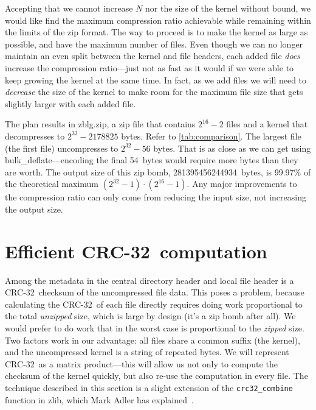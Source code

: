 \documentclass[letterpaper,twocolumn,10pt]{article}
\newcommand{\bulkdeflate}{\mbox{bulk\_deflate}}
\newcommand{\CRC}{\mbox{CRC-32}}
\begin{document}
Accepting that we cannot increase $N$ nor the size of the kernel without bound,
we would like find the maximum compression ratio achievable
while remaining within the limits of the zip format.
The way to proceed is to make the kernel as large as possible,
and have the maximum number of files.
Even though we can no longer maintain an even split
between the kernel and file headers,
each added file \emph{does} increase the compression ratio---just
not as fast as it would if we were able to keep growing the kernel at the same time.
In fact, as we add files we will need to \emph{decrease} the size of the kernel
to make room for the maximum file size
that gets slightly larger with each added file.

The plan results in \mbox{zblg.zip}, a zip file
that contains $2^{16}-2$ files and a kernel that decompresses
to $2^{32}-\num{2178825}$ bytes.
Refer to \autoref{tab:comparison}.
The largest file (the first file) uncompresses to
$2^{32} - 56$ bytes.
That is as close as we can get using \bulkdeflate---encoding
the final \SI{54}{bytes} would require more bytes
than they are worth.
The output size of this zip bomb, \SI{281395456244934}{bytes},
is 99.97\% of the theoretical maximum
$(2^{32}-1)\cdot(2^{16}-1)$.
Any major improvements to the compression ratio can only come
from reducing the input size,
not increasing the output size.


\section{Efficient \CRC\ computation}
\label{sec:crc32}

Among the metadata in the central directory header and local file header
is a \CRC\ checksum of the uncompressed file data.
This poses a problem, because calculating the \CRC\ of each file directly
requires doing work proportional to the total \emph{unzipped} size,
which is large by design (it's a zip bomb after all).
We would prefer to do work that in the worst case is
proportional to the \emph{zipped} size.
Two factors work in our advantage:
all files share a common suffix (the kernel),
and the uncompressed kernel is a string of repeated bytes.
We will represent \CRC\ as a matrix product---this
will allow us not only to compute the checksum of the kernel quickly,
but also re-use the computation in every file.
The technique described in this section is a slight extension of the
\texttt{crc32\_combine}
function in zlib,
which Mark Adler has explained~\cite{crc32combine}.
\end{document}

